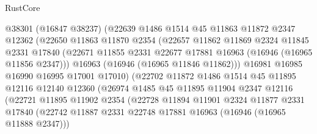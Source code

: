 \begin{lexlean}{RustCore}
\begin{coremodule}
                        @38301
                        (@16847 @38237)
                        (@22639
                          @1486
                          @1514
                          @45
                          @11863
                          @11872
                          @2347
                          @12362
                          (@22650
                            @11863
                            @11870
                            @2354
                            (@22657
                              @11862
                              @11869
                              @2324
                              @11845
                              @2331
                              @17840
                              (@22671
                                @11855
                                @2331
                                @22677
                                @17881
                                @16963
                                (@16946 (@16965 @11856 @2347)))
                              @16963
                              (@16946 (@16965 @11846 @11862)))
                            @16981
                            @16985
                            @16990
                            @16995
                            @17001
                            @17010)
                          (@22702
                            @11872
                            @1486
                            @1514
                            @45
                            @11895
                            @12116
                            @12140
                            @12360
                            (@26974
                              @1485
                              @45
                              @11895
                              @11904
                              @2347
                              @12116
                              (@22721
                                @11895
                                @11902
                                @2354
                                (@22728
                                  @11894
                                  @11901
                                  @2324
                                  @11877
                                  @2331
                                  @17840
                                  (@22742
                                    @11887
                                    @2331
                                    @22748
                                    @17881
                                    @16963
                                    (@16946 (@16965 @11888 @2347)))

\end{coremodule}
\end{lexlean}
